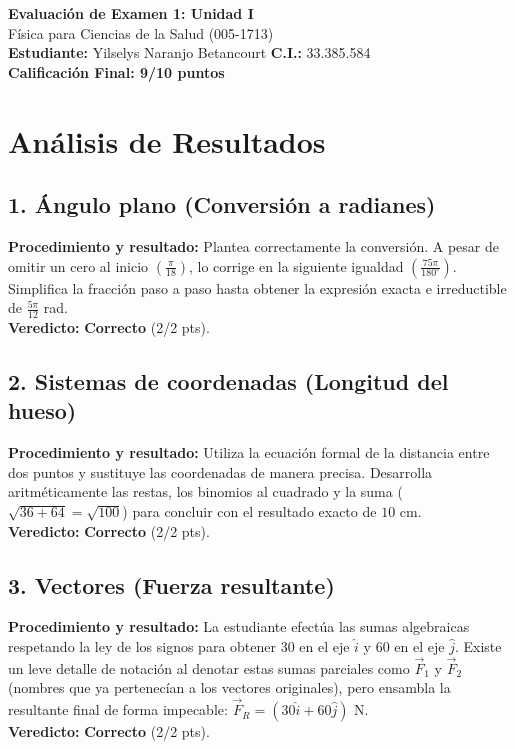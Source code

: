 \documentclass[12pt]{article}
\begin{document}
\begin{center}
    \Large \textbf{Evaluación de Examen 1: Unidad I} \\
    \large Física para Ciencias de la Salud (005-1713) \\
    \vspace{0.5cm}
    \textbf{Estudiante:} Yilselys Naranjo Betancourt \quad \textbf{C.I.:} 33.385.584
    \vspace{0.3cm} \\
    \large \textbf{Calificación Final: 9/10 puntos}
\end{center}

\vspace{0.5cm}

\section*{Análisis de Resultados}

\subsection*{1. Ángulo plano (Conversión a radianes)}
\textbf{Procedimiento y resultado:} Plantea correctamente la conversión. A pesar de omitir un cero al inicio $\left(\frac{\pi}{18}\right)$, lo corrige en la siguiente igualdad $\left(\frac{75\pi}{180^\circ}\right)$. Simplifica la fracción paso a paso hasta obtener la expresión exacta e irreductible de $\frac{5\pi}{12}$ rad. \\
\textbf{Veredicto:} \textbf{Correcto} (2/2 pts).

\subsection*{2. Sistemas de coordenadas (Longitud del hueso)}
\textbf{Procedimiento y resultado:} Utiliza la ecuación formal de la distancia entre dos puntos y sustituye las coordenadas de manera precisa. Desarrolla aritméticamente las restas, los binomios al cuadrado y la suma ($\sqrt{36+64} = \sqrt{100}$) para concluir con el resultado exacto de $10$ cm. \\
\textbf{Veredicto:} \textbf{Correcto} (2/2 pts).

\subsection*{3. Vectores (Fuerza resultante)}
\textbf{Procedimiento y resultado:} La estudiante efectúa las sumas algebraicas respetando la ley de los signos para obtener 30 en el eje $\hat{i}$ y 60 en el eje $\hat{j}$. Existe un leve detalle de notación al denotar estas sumas parciales como $\vec{F}_1$ y $\vec{F}_2$ (nombres que ya pertenecían a los vectores originales), pero ensambla la resultante final de forma impecable: $\vec{F}_R = (30\hat{i} + 60\hat{j})$ N. \\
\textbf{Veredicto:} \textbf{Correcto} (2/2 pts).
\end{document}

